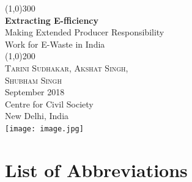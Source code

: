 \documentclass[a4paper, 12pt]{article}
\begin{document}
                    
                    \begin{titlepage}
                    	\begin{center}
                    	\line(1,0){300}\\
                    	[0.25in]
                    	\huge{\bfseries \textcolor{CCSbrown} {Extracting E-fficiency}} \\
    	[0.5cm]
    	\large  {Making Extended Producer Responsibility \\ Work for E-Waste in India} \\
    	
                    	\line(1,0){200}\\
                    	[1in]
                    	\textsc{\huge Tarini Sudhakar, Akshat Singh,\\ Shubham Singh} \\
                    	[1.5cm]
                    	{\Large September 2018} \\
                    	[2.0cm]
                    	{\LARGE Centre for Civil Society} \\
                    	[0.1mm]
                    	{\Large New Delhi, India} \\
    	[2.0cm]
    	 \texttt{[image: image.jpg]}
      
                    	\end{center}
                    \end{titlepage}
                    \tableofcontents
                    
                   \newpage
         
        \section*{List of Abbreviations}
        
         
\end{document}
